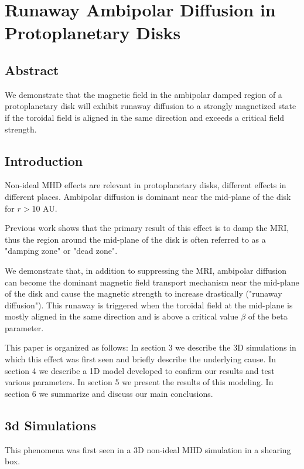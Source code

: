 \chapter{Runaway Ambipolar Diffusion in Protoplanetary Disks}
\label{chapterAD}





\section{Abstract}
We demonstrate that the magnetic field in the ambipolar damped region of a protoplanetary disk will exhibit runaway diffusion to a strongly magnetized state if the toroidal field is aligned in the same direction and exceeds a critical field strength.





\section{Introduction} 
Non-ideal MHD effects are relevant in protoplanetary disks, different effects in different places.  Ambipolar diffusion is dominant near the mid-plane of the disk for $r>10$ AU.  

Previous work shows that the primary result of this effect is to damp the MRI, thus the region around the mid-plane of the disk is often referred to as a "damping zone" or "dead zone".  

We demonstrate that, in addition to suppressing the MRI, ambipolar diffusion can become the dominant magnetic field transport mechanism near the mid-plane of the disk and cause the magnetic strength to increase drastically ("runaway diffusion").  This runaway is triggered when the toroidal field at the mid-plane is mostly aligned in the same direction and is above a critical value $\beta$ of the beta parameter. 

This paper is organized as follows: In section 3 we describe the 3D simulations in which this effect was first seen and briefly describe the underlying cause.  In section 4 we describe a 1D model developed to confirm our results and test various parameters.  In section 5 we present the results of this modeling.  In section 6 we summarize and discuss our main conclusions.  





\section{3d Simulations}
This phenomena was first seen in a 3D non-ideal MHD simulation in a shearing box.


